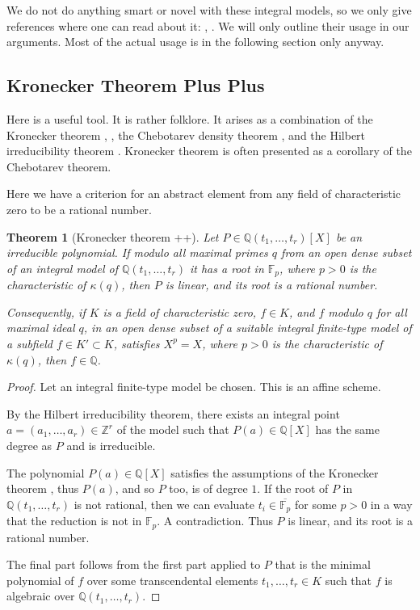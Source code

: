 \documentclass{amsart}
\newtheorem{thm}{Theorem}[section]
\theoremstyle{definition}
\begin{document}
We do not do anything smart or novel with these integral models, so we only give references where one can read about it: \cite[Chapter 10]{Liu_AG_book}, \cite[Chapter 0C2P]{stacks-project}. We will only outline their usage in our arguments. Most of the actual usage is in the following section only anyway.

\subsection{Kronecker Theorem Plus Plus}


Here is a useful tool. It is rather folklore. It arises as a combination of the Kronecker theorem \cite[Theorem 1.1.]{effective_p_conjecture_2026}, \cite[Section 24.5]{field-arithmetic-2023}, the Chebotarev density theorem \cite[Chapter 7]{field-arithmetic-2023}, and the Hilbert irreducibility theorem \cite[Chapter 13 and 14]{field-arithmetic-2023}. Kronecker theorem is often presented as a corollary of the Chebotarev theorem.

Here we have a criterion for an abstract element from any field of characteristic zero to be a rational number.

\begin{thm}[Kronecker theorem ++]\label{thm: kronecker ++}
    Let $P\in \mathbb{Q}(t_1,\ldots,t_r)[X]$ be an irreducible polynomial. 
    If modulo all maximal primes $q$ from an open dense subset of an integral model of $\mathbb{Q}(t_1,\ldots,t_r)$ it has a root in $\mathbb{F}_p$, where $p>0$ is the characteristic of $\kappa(q)$, then $P$ is linear, and its root is a rational number.

    Consequently, if $K$ is a field of characteristic zero, $f\in K$, and $f$ modulo $q$ for all maximal ideal $q$, in an open dense subset of a suitable integral finite-type model of a subfield $f\in K'\subset K$, satisfies $X^p=X$, where $p>0$ is the characteristic of $\kappa(q)$, then $f\in \mathbb{Q}$.
\end{thm}

\begin{proof}
    Let an integral finite-type model be chosen. This is an affine scheme.
    
    By the Hilbert irreducibility theorem, there exists an integral point $a=(a_1,\ldots,a_r)\in \mathbb{Z}^r$ of the model such that $P(a)\in \mathbb{Q}[X]$ has the same degree as $P$ and is irreducible.

    The polynomial $P(a)\in \mathbb{Q}[X]$ satisfies the assumptions of the Kronecker theorem \cite[Theorem 1.1.]{effective_p_conjecture_2026}, thus $P(a)$, and so $P$ too, is of degree $1$. If the root of $P$ in $\mathbb{Q}(t_1,\ldots,t_r)$ is not rational, then we can evaluate $t_i\in \overline{\mathbb{F}_p}$ for some $p>0$ in a way that the reduction is not in $\mathbb{F}_p$. A contradiction. Thus $P$ is linear, and its root is a rational number.

    The final part follows from the first part applied to $P$ that is the minimal polynomial of $f$ over some transcendental elements $t_1,\ldots,t_r\in K$ such that $f$ is algebraic over $\mathbb{Q}(t_1,\ldots,t_r)$.
\end{proof}
\end{document}
